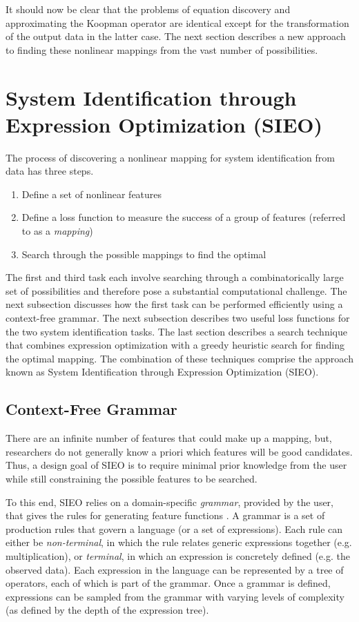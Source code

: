 \documentclass{article}
\begin{document}
It should now be clear that the problems of equation discovery and approximating the Koopman operator are identical except for the transformation of the output data in the latter case. The next section describes a new approach to finding these nonlinear mappings from the vast number of possibilities.

\section{System Identification through Expression Optimization (SIEO)}
\label{sieo}
The process of discovering a nonlinear mapping for system identification from data has three steps.
\begin{enumerate}
    \item Define a set of nonlinear features
    \item Define a loss function to measure the success of a group of features (referred to as a \textit{mapping})
    \item Search through the possible mappings to find the optimal
\end{enumerate}
The first and third task each involve searching through a combinatorically large set of possibilities and therefore pose a substantial computational challenge. The next subsection discusses how the first task can be performed efficiently using a context-free grammar. The next subsection describes two useful loss functions for the two system identification tasks. The last section describes a search technique that combines expression optimization with a greedy heuristic search for finding the optimal mapping. The combination of these techniques comprise the  approach known as System Identification through Expression Optimization (SIEO).

\subsection{Context-Free Grammar}

There are an infinite number of features that could make up a mapping, but, researchers do not generally know a priori which features will be good candidates. Thus, a design goal of SIEO is to require minimal prior knowledge from the user while still constraining the possible features to be searched.

To this end, SIEO relies on a domain-specific \textit{grammar}, provided by the user, that gives the rules for generating feature functions \cite{kochenderfer2019algorithms}. A grammar is a set of production rules that govern a language (or a set of expressions). Each rule can either be \textit{non-terminal}, in which the rule relates generic expressions together (e.g. multiplication), or \textit{terminal}, in which an expression is concretely defined (e.g. the observed data). Each expression in the language can be represented by a tree of operators, each of which is part of the grammar. Once a grammar is defined, expressions can be sampled from the grammar with varying levels of complexity (as defined by the depth of the expression tree).
\end{document}
